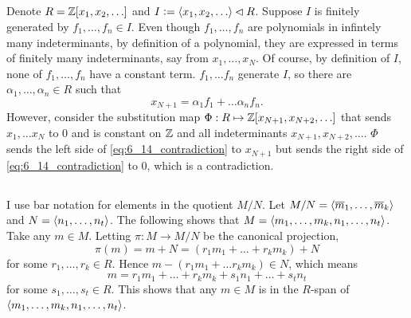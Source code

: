 \documentclass[12pt]{article}
\begin{document}
\subsection{} 
Denote $R =  \mathbb{Z}[x_1, x_2, \ldots]$ and $I \vcentcolon= \langle x_1, x_2, \ldots\rangle \lhd R$.  
Suppose $I$ is finitely generated by $f_1, \ldots, f_n \in I$. 
Even though $f_1, \ldots, f_n$ are polynomials in infintely many indeterminants, by definition of a polynomial, they are expressed in terms of finitely many indeterminants, say from $x_1, \ldots, x_N$. 
Of course, by definition of $I$, none of $f_1, \ldots, f_n$ have a constant term. 
$f_1, \ldots f_n$ generate $I$, so there are $\alpha_1, \ldots, \alpha_n \in R$ such that 
\begin{equation} \label{eq:6_14_contradiction}
  x_{N + 1} = \alpha_1 f_1 + \ldots \alpha_n f_n.
\end{equation}
However, consider the substitution map $\Phi: R \mapsto \mathbb{Z}[x_{N + 1}, x_{N + 2}, \ldots]$ that sends $x_1, \ldots x_N$ to 0 and is constant on $\mathbb{Z}$ and all indeterminants $x_{N + 1}, x_{N + 2}, \ldots$. 
$\Phi$ sends the left side of \eqref{eq:6_14_contradiction} to $x_{N + 1}$ but sends the right side of \eqref{eq:6_14_contradiction} to 0, which is a contradiction. 

\setcounter{subsection}{17} 
\subsection{} 
I use bar notation for elements in the quotient $M / N$. 
Let $M / N = \langle\overline{m}_1, \ldots, \overline{m}_k\rangle$ and $N = \langle n_1, \ldots, n_t\rangle$. 
The following shows that $M = \langle m_1, \ldots, m_k, n_1, \ldots, n_t\rangle$. 
Take any $m \in M$.
Letting $\pi:M \rightarrow M / N$ be the canonical projection, 
$$\pi(m) = m + N = (r_1 m_1 + \ldots + r_k m_k) + N$$ 
for some $r_1, \ldots, r_k \in R$. 
Hence $m - (r_1 m_1 + \ldots r_k m_k) \in N$, which means 
$$m = r_1 m_1 + \ldots + r_k m_k + s_1 n_1 + \ldots + s_t n_t$$
for some $s_1, \ldots, s_t \in R$. 
This shows that any $m \in M$ is in the $R$-span of $\langle m_1, \ldots, m_k, n_1, \ldots, n_t\rangle$. 
\end{document}
